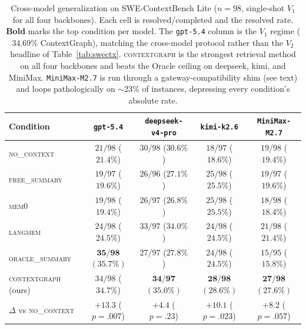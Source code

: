 \begin{table}[h]
\centering
\caption{Cross-model generalization on SWE-ContextBench Lite ($n{=}98$, single-shot $V_1$ for all four backbones). Each cell is resolved/completed and the resolved rate. \textbf{Bold} marks the top condition per model. The \texttt{gpt-5.4} column is the $V_1$ regime ($34.69\%$ ContextGraph), matching the cross-model protocol rather than the $V_2$ headline of Table~\ref{tab:swectx}. \textsc{contextgraph} is the strongest retrieval method on all four backbones and beats the Oracle ceiling on deepseek, kimi, and MiniMax. \texttt{MiniMax-M2.7} is run through a gateway-compatibility shim (see text) and loops pathologically on $\sim$23\% of instances, depressing every condition's absolute rate.}
\label{tab:swectx-crossmodel}
\small
\begin{tabular}{lcccc}
\toprule
\textbf{Condition} & \texttt{gpt-5.4} & \texttt{deepseek-v4-pro} & \texttt{kimi-k2.6} & \texttt{MiniMax-M2.7} \\
\midrule
\textsc{no\_context}     & $21/98$ ($21.4\%$) & $30/98$ ($30.6\%$) & $18/97$ ($18.6\%$) & $19/98$ ($19.4\%$) \\
\textsc{free\_summary}   & $19/97$ ($19.6\%$) & $26/96$ ($27.1\%$) & $25/98$ ($25.5\%$) & $19/97$ ($19.6\%$) \\
\textsc{mem0}            & $19/98$ ($19.4\%$) & $26/97$ ($26.8\%$) & $25/98$ ($25.5\%$) & $18/98$ ($18.4\%$) \\
\textsc{langmem}         & $24/98$ ($24.5\%$) & $33/97$ ($34.0\%$) & $24/98$ ($24.5\%$) & $21/98$ ($21.4\%$) \\
\textsc{oracle\_summary} & $\mathbf{35/98}$ $\mathbf{(35.7\%)}$ & $27/97$ ($27.8\%$) & $24/98$ ($24.5\%$) & $15/95$ ($15.8\%$) \\
\textsc{contextgraph} (ours) & $34/98$ ($34.7\%$) & $\mathbf{34/97}$ $\mathbf{(35.0\%)}$ & $\mathbf{28/98}$ $\mathbf{(28.6\%)}$ & $\mathbf{27/98}$ $\mathbf{(27.6\%)}$ \\
\midrule
$\Delta$ vs \textsc{no\_context} & $+13.3$ ($p{=}.007$) & $+4.4$ ($p{=}.23$) & $+10.1$ ($p{=}.023$) & $+8.2$ ($p{=}.057$) \\
\bottomrule
\end{tabular}
\end{table}

